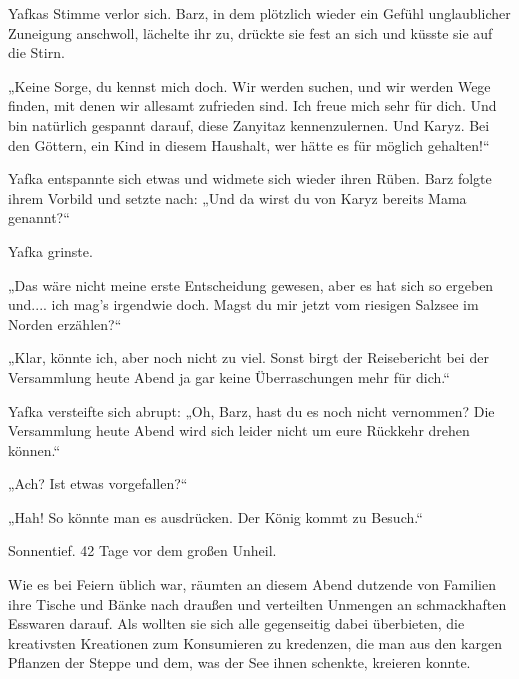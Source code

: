 Yafkas Stimme verlor sich. Barz, in dem plötzlich wieder ein Gefühl unglaublicher Zuneigung anschwoll, lächelte ihr zu, drückte sie fest an sich und küsste sie auf die Stirn.

„Keine Sorge, du kennst mich doch. Wir werden suchen, und wir werden Wege finden, mit denen wir allesamt zufrieden sind. Ich freue mich sehr für dich. Und bin natürlich gespannt darauf, diese Zanyitaz kennenzulernen. Und Karyz. Bei den Göttern, ein Kind in diesem Haushalt, wer hätte es für möglich gehalten!“

Yafka entspannte sich etwas und widmete sich wieder ihren Rüben. Barz folgte ihrem Vorbild und setzte nach: „Und da wirst du von Karyz bereits Mama genannt?“

Yafka grinste.

„Das wäre nicht meine erste Entscheidung gewesen, aber es hat sich so ergeben und.... ich mag’s irgendwie doch. Magst du mir jetzt vom riesigen Salzsee im Norden erzählen?“

„Klar, könnte ich, aber noch nicht zu viel. Sonst birgt der Reisebericht bei der Versammlung heute Abend ja gar keine Überraschungen mehr für dich.“

Yafka versteifte sich abrupt: „Oh, Barz, hast du es noch nicht vernommen? Die Versammlung heute Abend wird sich leider nicht um eure Rückkehr drehen können.“

„Ach? Ist etwas vorgefallen?“

„Hah! So könnte man es ausdrücken. Der König kommt zu Besuch.“



\trennzeichen



Sonnentief. 42 Tage vor dem großen Unheil.\bigskip



Wie es bei Feiern üblich war, räumten an diesem Abend dutzende von Familien ihre Tische und Bänke nach draußen und verteilten Unmengen an schmackhaften Esswaren darauf. Als wollten sie sich alle gegenseitig dabei überbieten, die kreativsten Kreationen zum Konsumieren zu kredenzen, die man aus den kargen Pflanzen der Steppe und dem, was der See ihnen schenkte, kreieren konnte.

